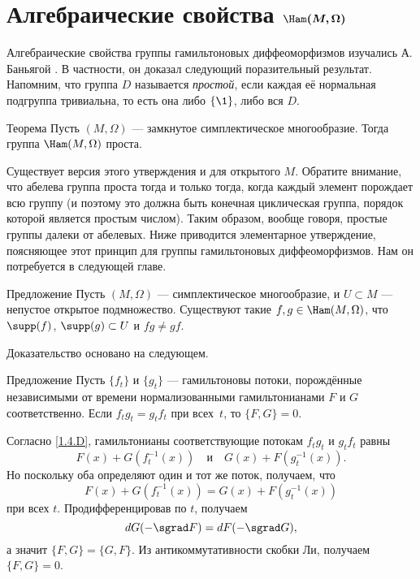 \section[\texorpdfstring{Алгебраические свойства $\Ham(M,\Omega)$}{Алгебраические свойства Ham(M,Ω)}]%
{Алгебраические свойства $\bm{\Ham(M, \Omega)}$}

Алгебраические свойства группы гамильтоновых диффеоморфизмов изучались А. Баньягой \cite{B1,B2}.
В частности, он доказал следующий поразительный результат.
Напомним, что группа $D$ называется \emph{простой}, если каждая её нормальная подгруппа тривиальна, то есть она либо $\{\1\}$, либо вся $D$.

\begin{thm}{Теорема}\label{1.5.A}
Пусть $(M, \Omega)$ — замкнутое симплектическое многообразие.
Тогда группа $\Ham (M, \Omega)$ проста.
\end{thm}

Существует версия этого утверждения и для открытого $M$.
Обратите внимание, что абелева группа проста тогда и только тогда, когда каждый элемент порождает всю группу (и поэтому это должна быть конечная циклическая группа, порядок которой является простым числом).
Таким образом, вообще говоря, простые группы далеки от абелевых.
Ниже приводится элементарное утверждение, поясняющее этот принцип для группы гамильтоновых диффеоморфизмов.
Нам он потребуется в следующей главе.

\begin{thm}{Предложение}\label{1.5.B}
Пусть $(M, \Omega)$ — симплектическое многообразие, и $U \subset M$ — непустое открытое подмножество.
Существуют такие $f, g \in \Ham (M, \Omega)$, что $\supp (f)$, $\supp (g) \subset U$ и $f g \ne gf$.
\end{thm}

Доказательство основано на следующем.

\begin{thm}{Предложение}\label{1.5.C}
Пусть $\{f_t\}$ и $\{g_t\}$ — гамильтоновы потоки, порождённые независимыми от времени нормализованными гамильтонианами $F$ и $G$ соответственно.
Если $f_t g_t = g_t f_t$ при всех~$t$, то $\{F, G\} = 0$.
\end{thm}

Согласно \ref{1.4.D}, гамильтонианы соответствующие потокам $f_t g_t$ и $g_t f_t$ равны
\[F(x)+G(f_t^{-1} (x))
\quad\text{и}\quad
G (x) + F (g_t^{-1}(x)).
\]
Но поскольку оба определяют один и тот же поток, получаем, что 
\[F (x) + G (f_t^{-1} (x)) = G (x) + F (g_t^{-1} (x))\]
при всех $t$.
Продифференцировав по $t$, получаем
\[\d G(-\sgrad F)=\d F(-\sgrad G),\]
а значит $\{F, G\} = \{G, F\}$.
Из антикоммутативности скобки Ли, получаем $\{F, G\} = 0$.
\qeds

